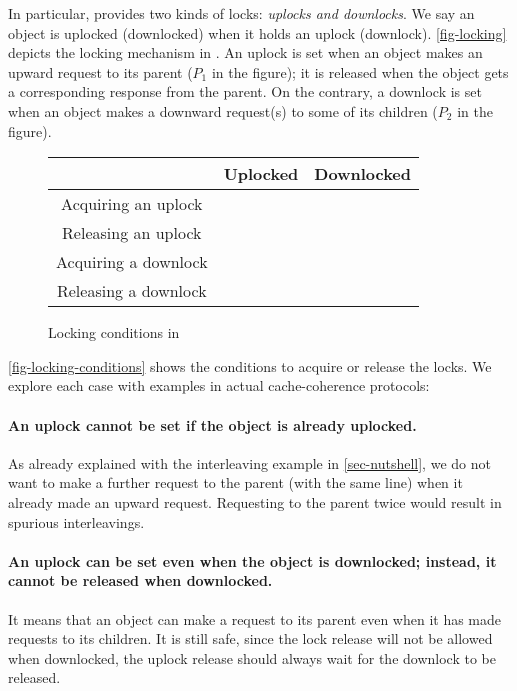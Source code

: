 In particular, \hemiola{} provides two kinds of locks: \emph{uplocks and downlocks}.
We say an object is uplocked (downlocked) when it holds an uplock (downlock).
\autoref{fig-locking} depicts the locking mechanism in \hemiola{}.
An uplock is set when an object makes an upward request to its parent ($P_1$ in the figure); it is released when the object gets a corresponding response from the parent.
On the contrary, a downlock is set when an object makes a downward request(s) to some of its children ($P_2$ in the figure).

\begin{figure}[h]
  \centering
  \renewcommand{\arraystretch}{1.2}
  \newcommand{\lockyes}{\cmark}
  \newcommand{\lockno}{\xmark}
  \begin{tabular}{ccc}
    \hline
    & Uplocked & Downlocked\\
    \hline
    Acquiring an uplock & \lockno & \lockyes\\
    Releasing an uplock & \lockyes & \lockno\\
    Acquiring a downlock & \lockyes & \lockno\\
    Releasing a downlock & \lockyes & \lockyes\\
    \hline
  \end{tabular}
  \caption{Locking conditions in \hemiola{}}
  \label{fig-locking-conditions}
\end{figure}

\autoref{fig-locking-conditions} shows the conditions to acquire or release the locks.
We explore each case with examples in actual cache-coherence protocols:

\paragraph{An uplock cannot be set if the object is already uplocked.}
As already explained with the interleaving example in \autoref{sec-nutshell}, we do not want to make a further request to the parent (with the same line) when it already made an upward request.
Requesting to the parent twice would result in spurious interleavings.

\paragraph{An uplock can be set even when the object is downlocked; instead, it cannot be released when downlocked.}
It means that an object can make a request to its parent even when it has made requests to its children.
It is still safe, since the lock release will not be allowed when downlocked, \ie{} the uplock release should always wait for the downlock to be released.

